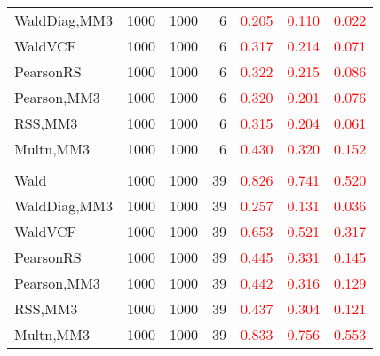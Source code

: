 \documentclass[
]{article}
\begin{document}
\begin{table}[H]
{\begin{tabular}[t]{lrrrrrr}
\hspace{1em}WaldDiag,MM3 & 1000 & 1000 & 6 & \textcolor{red}{0.205} & \textcolor{red}{0.110} & \textcolor{red}{0.022}\\
\hspace{1em}WaldVCF & 1000 & 1000 & 6 & \textcolor{red}{0.317} & \textcolor{red}{0.214} & \textcolor{red}{0.071}\\
\hspace{1em}PearsonRS & 1000 & 1000 & 6 & \textcolor{red}{0.322} & \textcolor{red}{0.215} & \textcolor{red}{0.086}\\
\hspace{1em}Pearson,MM3 & 1000 & 1000 & 6 & \textcolor{red}{0.320} & \textcolor{red}{0.201} & \textcolor{red}{0.076}\\
\hspace{1em}RSS,MM3 & 1000 & 1000 & 6 & \textcolor{red}{0.315} & \textcolor{red}{0.204} & \textcolor{red}{0.061}\\
\hspace{1em}Multn,MM3 & 1000 & 1000 & 6 & \textcolor{red}{0.430} & \textcolor{red}{0.320} & \textcolor{red}{0.152}\\
\addlinespace[0.3em]
\multicolumn{7}{l}{\textbf{3F 15V}}\\
\hspace{1em}Wald & 1000 & 1000 & 39 & \textcolor{red}{0.826} & \textcolor{red}{0.741} & \textcolor{red}{0.520}\\
\hspace{1em}WaldDiag,MM3 & 1000 & 1000 & 39 & \textcolor{red}{0.257} & \textcolor{red}{0.131} & \textcolor{red}{0.036}\\
\hspace{1em}WaldVCF & 1000 & 1000 & 39 & \textcolor{red}{0.653} & \textcolor{red}{0.521} & \textcolor{red}{0.317}\\
\hspace{1em}PearsonRS & 1000 & 1000 & 39 & \textcolor{red}{0.445} & \textcolor{red}{0.331} & \textcolor{red}{0.145}\\
\hspace{1em}Pearson,MM3 & 1000 & 1000 & 39 & \textcolor{red}{0.442} & \textcolor{red}{0.316} & \textcolor{red}{0.129}\\
\hspace{1em}RSS,MM3 & 1000 & 1000 & 39 & \textcolor{red}{0.437} & \textcolor{red}{0.304} & \textcolor{red}{0.121}\\
\hspace{1em}Multn,MM3 & 1000 & 1000 & 39 & \textcolor{red}{0.833} & \textcolor{red}{0.756} & \textcolor{red}{0.553}\\
\bottomrule
\end{tabular}}
\endgroup{}
\end{table}
\end{document}
